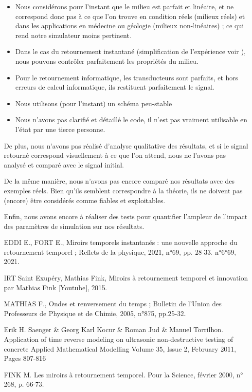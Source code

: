 \documentclass[11pt, a4paper]{article}
\begin{document}
\begin{itemize}
    \item Nous considérons pour l'instant que le milieu est parfait et linéaire, et ne correspond donc pas à ce que l'on trouve en condition réels (milieux réels) et dans les applications en médecine ou géologie (milieux non-linéaires) ; ce qui rend notre simulateur moins pertinent. 

    \item Dans le cas du retournement instantané (simplification de l'expérience voir \cite{ref1}), nous pouvons contrôler parfaitement les propriétés du milieu. 

    \item Pour le retournement informatique, les transducteurs sont parfaits, et hors erreurs de calcul informatique, ils restituent parfaitement le signal. 

    \item Nous utilisons (pour l'instant) un schéma peu-stable 

    \item Nous n'avons pas clarifié et détaillé le code, il n'est pas vraiment utilisable en l'état par une tierce personne. 
\end{itemize}
  

De plus, nous n'avons pas réalisé d'analyse qualitative des résultats, et si le signal retourné correspond visuellement à ce que l'on attend, nous ne l'avons pas analysé et comparé avec le signal initial. 

De la même manière, nous n'avons pas encore comparé nos résultats avec des exemples réels. Bien qu'ils semblent correspondre à la théorie, ils ne doivent pas (encore) être considérés comme fiables et exploitables. 

Enfin, nous avons encore à réaliser des tests pour quantifier l'ampleur de l'impact des paramètres de simulation sur nos résultats. 


\begin{thebibliography}{99}  

    EDDI E., FORT E., Miroirs temporels instantanés : une nouvelle approche du retournement temporel ; Reflets de la physique, 2021, n°69, pp. 28-33. n°6°69, 2021. 

    IRT Saint Exupéry, Mathias Fink, Miroirs à retournement temporel et innovation par Mathias Fink [Youtube], 2015. 
    
    MATHIAS F., Ondes et renversement du temps ; Bulletin de l'Union des Professeurs de Physique et de Chimie, 2005, n°875, pp.25-32. 
    
    Erik H. Saenger \& Georg Karl Kocur \& Roman Jud \& Manuel Torrilhon. Application of time reverse modeling on ultrasonic non-destructive testing of concrete Applied Mathematical Modelling Volume 35, Issue 2, February 2011, Pages 807-816 
    
    FINK M. Les miroirs à retournement temporel. Pour la Science, février 2000, n° 268, p. 66-73. 
    
    \end{thebibliography}
\end{document}
